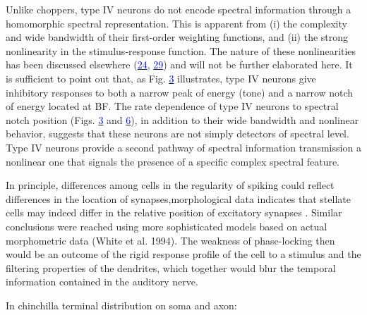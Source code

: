 \documentclass[10pt,a4paper]{article}
\newcommand\textstyleInternetlink[1]{\textcolor{blue}{#1}}
\begin{document}
Unlike choppers, type IV neurons do not encode spectral information through a
homomorphic spectral representation. This is apparent from (i) the complexity
and wide bandwidth of their first-order weighting functions, and (ii) the strong
nonlinearity in the stimulus-response function. The nature of these
nonlinearities has been discussed elsewhere
(\href{www.pnas.org/cgi/content/full/97/22/11780#B24}{\textstyleInternetlink{24}},
\href{www.pnas.org/cgi/content/full/97/22/11780#B29}{\textstyleInternetlink{29}})
and will not be further elaborated here. It is sufficient to point out that, as
Fig.
\href{www.pnas.org/cgi/content/full/97/22/11780#F3}{\textstyleInternetlink{3}}
illustrates, type IV neurons give inhibitory responses to both a narrow peak of
energy (tone) and a narrow notch of energy located at BF. The rate dependence of
type IV neurons to spectral notch position (Figs.
\href{www.pnas.org/cgi/content/full/97/22/11780#F3}{\textstyleInternetlink{3}}
and
\href{www.pnas.org/cgi/content/full/97/22/11780#F6}{\textstyleInternetlink{6}}),
in addition to their wide bandwidth and nonlinear behavior, suggests that these
neurons are not simply detectors of spectral level. Type IV neurons provide a
second pathway of spectral information transmission
a nonlinear one that signals the presence of a specific complex spectral
feature.


\citep{Trussell:2002}

In principle, differences among cells in the regularity of spiking could reflect
differences in the location of synapses,morphological data indicates that
stellate cells may indeed differ in the relative position of excitatory synapses
\citep{ SmithRhode:1989}. Similar conclusions were reached using more
sophisticated models based on actual morphometric data (White et al. 1994).  The
weakness of phase-locking then would be an outcome of the rigid response profile
of the cell to a stimulus and the filtering properties of the dendrites, which
together would blur the temporal information contained in the auditory nerve.

In chinchilla \citep{JosephsonMorest:1998} terminal distribution on soma and
axon:
\end{document}
